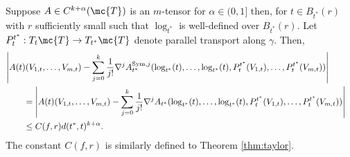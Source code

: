 \documentclass{article}
\begin{document}
\begin{theorem}
\label{thm:taylor:tensor}
  Suppose $A \in C^{k+\alpha}(\mc{T})$ is an $m$-tensor for $\alpha \in (0, 1]$ then, for $t \in B_{t^*}(r)$ with $r$ sufficiently small such that $\log_{t^*}$ is well-defined
    over $B_{t^*}(r)$. Let $P_t^{t^*}:T_{t}\mc{T} \to T_{t^*} \mc{T}$ denote
    parallel transport along $\gamma$. Then,
  \begin{equation}
    \label{eq:taylor:theorem}
\begin{aligned}
  \lefteqn{    \left|A(t)(V_{1,t}, \dots, V_{m,t}) - \sum_{j=0}^k \frac{1}{j!} \nabla^j A^{\mathrm{Sym},j}_{t^*}(\log_{t^*}(t), \dots, \log_{t^*}(t), P_t^{t^*}(V_{1,t}), \dots, P_t^{t^*}(V_{m,t})) \right| } \\
  & \qquad =     \left|A(t)(V_{1,t}, \dots, V_{m,t}) - \sum_{j=0}^k \frac{1}{j!} \nabla^j A_{t^*}(\log_{t^*}(t), \dots, \log_{t^*}(t), P_t^{t^*}(V_{1,t}), \dots, P_t^{t^*}(V_{m,t})) \right| \\
  & \qquad \leq C(f,r) d(t^*,t)^{k+\alpha}.
\end{aligned}
    \end{equation}
The constant $C(f, r)$ is similarly defined to Theorem \ref{thm:taylor}.
  \end{theorem}
\end{document}
